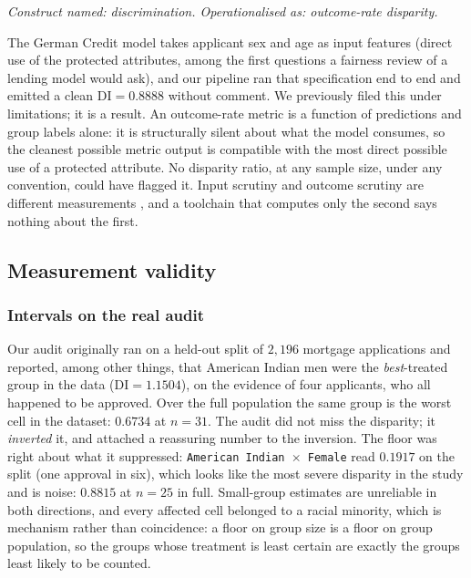 \documentclass[sigconf,nonacm]{acmart}
\begin{document}
\emph{Construct named: discrimination. Operationalised as: outcome-rate
disparity.}

The German Credit model takes applicant sex and age as input features
(direct use of the protected attributes, among the first questions a fairness
review of a lending model would ask), and our pipeline ran that
specification end to end and emitted a clean $\mathrm{DI}=0.8888$ without
comment. We previously filed this under limitations; it is a
result. An outcome-rate metric is a function of
predictions and group labels alone: it is structurally silent about what the
model consumes, so the cleanest possible metric output is compatible with the
most direct possible use of a protected attribute. No disparity ratio, at any
sample size, under any convention, could have flagged it. Input scrutiny
and outcome scrutiny are different measurements \citep{gillis2022}, and a
toolchain that computes only the second says nothing about the first.

\subsection{Measurement validity}
\label{sec:validity}

\subsubsection{Intervals on the real audit}
\label{sec:intervals}

Our audit originally ran on a held-out split of $2{,}196$ mortgage
applications and reported, among other things, that American Indian men were
the \emph{best}-treated group in the data ($\mathrm{DI}=1.1504$), on the
evidence of four applicants, who all happened to be approved. Over the full
population the same group is the worst cell in the dataset: $0.6734$ at
$n{=}31$. The audit did not miss the disparity; it \emph{inverted} it, and
attached a reassuring number to the inversion. The floor was right about what
it suppressed: \texttt{American Indian $\times$ Female} read $0.1917$ on the
split (one approval in six), which looks like the most severe disparity in the
study and is noise: $0.8815$ at $n{=}25$ in full. Small-group estimates are
unreliable in both directions, and every affected cell belonged to a racial
minority, which is mechanism rather than coincidence: a floor on group size is
a floor on group population, so the groups whose treatment is least certain
are exactly the groups least likely to be counted.
\end{document}
